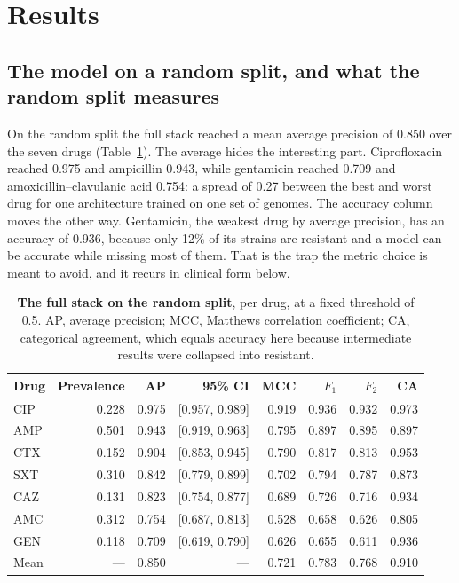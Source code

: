 \section*{Results}

\subsection*{The model on a random split, and what the random split measures}

On the random split the full stack reached a mean average precision of 0.850 over the seven drugs
(Table~\ref{tab:main}). The average hides the interesting part. Ciprofloxacin reached 0.975 and
ampicillin 0.943, while gentamicin reached 0.709 and amoxicillin--clavulanic acid 0.754: a spread
of 0.27 between the best and worst drug for one architecture trained on one set of genomes. The
accuracy column moves the other way. Gentamicin, the weakest drug by average precision, has an
accuracy of 0.936, because only 12\% of its strains are resistant and a model can be accurate while
missing most of them. That is the trap the metric choice is meant to avoid, and it recurs in
clinical form below.

\begin{table}[t]\centering\small
\caption{\textbf{The full stack on the random split}, per drug, at a fixed threshold of 0.5.
AP, average precision; MCC, Matthews correlation coefficient; CA, categorical agreement, which
equals accuracy here because intermediate results were collapsed into resistant.}
\label{tab:main}
\begin{tabular}{lrrrrrrr}
\toprule
Drug & Prevalence & AP & 95\% CI & MCC & $F_1$ & $F_2$ & CA \\
\midrule
CIP & 0.228 & 0.975 & [0.957, 0.989] & 0.919 & 0.936 & 0.932 & 0.973 \\
AMP & 0.501 & 0.943 & [0.919, 0.963] & 0.795 & 0.897 & 0.895 & 0.897 \\
CTX & 0.152 & 0.904 & [0.853, 0.945] & 0.790 & 0.817 & 0.813 & 0.953 \\
SXT & 0.310 & 0.842 & [0.779, 0.899] & 0.702 & 0.794 & 0.787 & 0.873 \\
CAZ & 0.131 & 0.823 & [0.754, 0.877] & 0.689 & 0.726 & 0.716 & 0.934 \\
AMC & 0.312 & 0.754 & [0.687, 0.813] & 0.528 & 0.658 & 0.626 & 0.805 \\
GEN & 0.118 & 0.709 & [0.619, 0.790] & 0.626 & 0.655 & 0.611 & 0.936 \\
\midrule
Mean & --- & 0.850 & --- & 0.721 & 0.783 & 0.768 & 0.910 \\
\bottomrule
\end{tabular}
\end{table}

